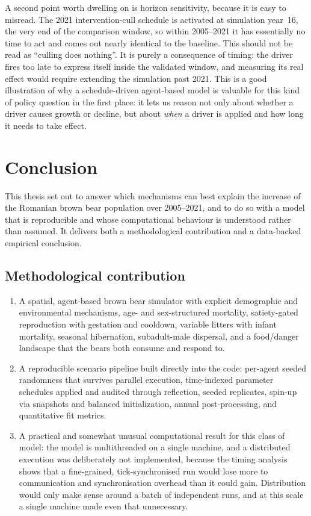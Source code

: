 A second point worth dwelling on is horizon sensitivity, because it is easy to misread. The 2021 intervention-cull schedule is activated at simulation year~16, the very end of the comparison window, so within 2005--2021 it has essentially no time to act and comes out nearly identical to the baseline. This should not be read as ``culling does nothing''. It is purely a consequence of timing: the driver fires too late to express itself inside the validated window, and measuring its real effect would require extending the simulation past 2021. This is a good illustration of why a schedule-driven agent-based model is valuable for this kind of policy question in the first place: it lets us reason not only about whether a driver causes growth or decline, but about \emph{when} a driver is applied and how long it needs to take effect.

\section{Conclusion}

This thesis set out to answer which mechanisms can best explain the increase of the Romanian brown bear population over 2005--2021, and to do so with a model that is reproducible and whose computational behaviour is understood rather than assumed. It delivers both a methodological contribution and a data-backed empirical conclusion.

\subsection*{Methodological contribution}

\begin{enumerate}
    \item A spatial, agent-based brown bear simulator with explicit demographic and environmental mechanisms, age- and sex-structured mortality, satiety-gated reproduction with gestation and cooldown, variable litters with infant mortality, seasonal hibernation, subadult-male dispersal, and a food/danger landscape that the bears both consume and respond to.
    \item A reproducible scenario pipeline built directly into the code: per-agent seeded randomness that survives parallel execution, time-indexed parameter schedules applied and audited through reflection, seeded replicates, spin-up via snapshots and balanced initialization, annual post-processing, and quantitative fit metrics.
    \item A practical and somewhat unusual computational result for this class of model: the model is multithreaded on a single machine, and a distributed execution was deliberately not implemented, because the timing analysis shows that a fine-grained, tick-synchronised run would lose more to communication and synchronisation overhead than it could gain. Distribution would only make sense around a batch of independent runs, and at this scale a single machine made even that unnecessary.
\end{enumerate}

